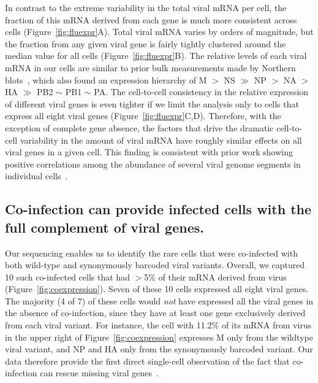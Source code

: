 \documentclass[9pt,lineno]{elife}
\begin{document}
In contrast to the extreme variability in the total viral mRNA per cell, the fraction of this mRNA derived from each gene is much more consistent across cells (Figure~\ref{fig:fluexpr}A).
Total viral mRNA varies by orders of magnitude, but the fraction from any given viral gene is fairly tightly clustered around the median value for all cells (Figure~\ref{fig:fluexpr}B).
The relative levels of each viral mRNA in our cells are similar to prior bulk measurements made by Northern blots~\citep{hatada1989control}, which also found an expression hierarchy of M $>$ NS $\gg$ NP $>$ NA $>$ HA $\gg$ PB2 $\sim$ PB1 $\sim$ PA.
The cell-to-cell consistency in the relative expression of different viral genes is even tighter if we limit the analysis only to cells that express all eight viral genes (Figure~\ref{fig:fluexpr}C,D).
Therefore, with the exception of complete gene absence, the factors that drive the dramatic cell-to-cell variability in the amount of viral mRNA have roughly similar effects on all viral genes in a given cell.
This finding is consistent with prior work showing positive correlations among the abundance of several viral genome segments in individual cells~\citep{Heldt:2015iz}.

\subsection{Co-infection can provide infected cells with the full complement of viral genes.}
Our sequencing enables us to identify the rare cells that were co-infected with both wild-type and synonymously barcoded viral variants.
Overall, we captured 10 such co-infected cells that had $>$5\% of their mRNA derived from virus (Figure~\ref{fig:coexpression}).
Seven of these 10 cells expressed all eight viral genes.
The majority (4 of 7) of these cells would \emph{not} have expressed all the viral genes in the absence of co-infection, since they have at least one gene exclusively derived from each viral variant.
For instance, the cell with 11.2\% of its mRNA from virus in the upper right of Figure~\ref{fig:coexpression} expresses M only from the wildtype viral variant, and NP and HA only from the synonymously barcoded variant.
Our data therefore provide the first direct single-cell observation of the fact that co-infection can rescue missing viral genes~\citep{Brooke:2013kb,brooke2014influenza,Fonville:2015cg,aguilera2017plaques}.
\end{document}
